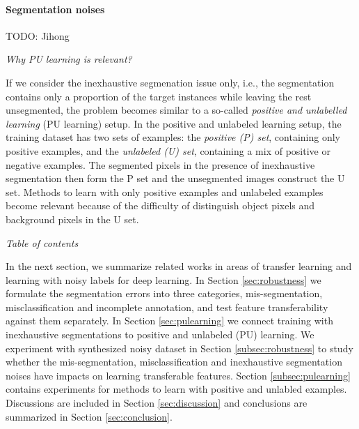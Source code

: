 

\paragraph{Segmentation noises}
{TODO: Jihong}




\noindent \textit{Why PU learning is relevant?
}


If we consider the inexhaustive segmenation issue only, i.e., the segmentation contains only a proportion of the target instances while leaving the rest unsegmented, the problem becomes similar to a so-called \textit{positive and unlabelled learning} (PU learning) setup\cite{li2005learning}.
In the positive and unlabeled learning setup, the training dataset has two sets of examples: the \textit{positive (P) set}, containing only positive examples, and the \textit{unlabeled (U) set}, containing a mix of positive or negative examples.
The segmented pixels in the presence of inexhaustive segmentation then form the P set and the unsegmented images construct the U set.
Methods to learn with only positive examples and unlabeled examples become relevant because of the difficulty of distinguish object pixels and background pixels in the U set.


\noindent \textit{Table of contents}

\noindent
In the next section, we summarize related works in areas of transfer learning and learning with noisy labels for deep learning.
In Section \ref{sec:robustness} we formulate the segmentation errors into three categories, mis-segmentation, misclassification and incomplete annotation, and test feature transferability against them separately.
In Section \ref{sec:pulearning} we connect training with inexhaustive segmentations to positive and unlabeled (PU) learning.
We experiment with synthesized noisy dataset in Section \ref{subsec:robustness} to study whether the mis-segmentation, misclassification and inexhaustive segmentation noises have impacts on learning transferable features.
Section \ref{subsec:pulearning} contains experiments for methods to learn with positive and unlabled examples.
Discussions are included in Section \ref{sec:discussion} and conclusions are summarized in Section \ref{sec:conclusion}.




